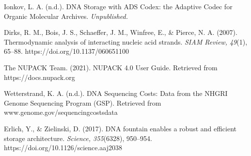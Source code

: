 \documentclass{article}
\begin{document}
\begin{thebibliography}{5}
Ionkov, L. A. (n.d.). DNA Storage with ADS Codex: the Adaptive Codec for Organic Molecular Archives. \textit{Unpublished.} 

Dirks, R. M., Bois, J. S., Schaeffer, J. M., Winfree, E., \& Pierce, N. A. (2007). Thermodynamic analysis of interacting nucleic acid strands. \textit{SIAM Review, 49}(1), 65–88. https://doi.org/10.1137/060651100 

The NUPACK Team. (2021). NUPACK 4.0 User Guide. Retrieved from https://docs.nupack.org 

Wetterstrand, K. A. (n.d.). DNA Sequencing Costs: Data from the NHGRI Genome Sequencing Program (GSP). Retrieved from www.genome.gov/sequencingcostsdata

Erlich, Y., \& Zielinski, D. (2017). DNA fountain enables a robust and efficient storage architecture. \textit{Science, 355}(6328), 950–954. https://doi.org/10.1126/science.aaj2038 

\end{thebibliography}
\end{document}
